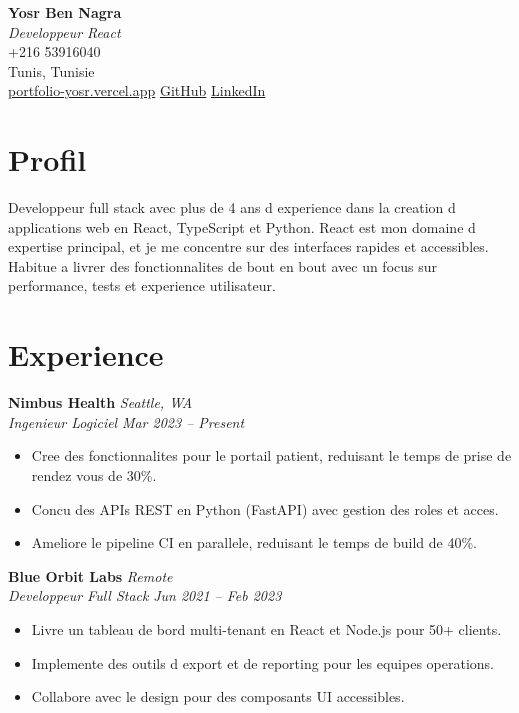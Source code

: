 \documentclass[11pt,a4paper]{article}
\begin{document}
\begin{center}
  {\LARGE\textbf{Yosr Ben Nagra}}\\
  \vspace{2pt}
  \textit{Developpeur React}\\
  \vspace{4pt}
  +216 53916040\\
  Tunis, Tunisie\\
  \href{https://portfolio-yosr.vercel.app/en}{portfolio-yosr.vercel.app} \textbar{} \href{https://github.com/YosrBennagra}{GitHub} \textbar{} \href{https://www.linkedin.com/in/yosr-ben-nagra/}{LinkedIn}
\end{center}

\section*{Profil}
Developpeur full stack avec plus de 4 ans d experience dans la creation d applications web en React, TypeScript et Python. React est mon domaine d expertise principal, et je me concentre sur des interfaces rapides et accessibles. Habitue a livrer des fonctionnalites de bout en bout avec un focus sur performance, tests et experience utilisateur.

\section*{Experience}
\textbf{Nimbus Health} \hfill \textit{Seattle, WA}\\
\textit{Ingenieur Logiciel} \hfill \textit{Mar 2023 -- Present}
\begin{itemize}[leftmargin=12pt,itemsep=2pt]
  \item Cree des fonctionnalites pour le portail patient, reduisant le temps de prise de rendez vous de 30\%.
  \item Concu des APIs REST en Python (FastAPI) avec gestion des roles et acces.
  \item Ameliore le pipeline CI en parallele, reduisant le temps de build de 40\%.
\end{itemize}

\textbf{Blue Orbit Labs} \hfill \textit{Remote}\\
\textit{Developpeur Full Stack} \hfill \textit{Jun 2021 -- Feb 2023}
\begin{itemize}[leftmargin=12pt,itemsep=2pt]
  \item Livre un tableau de bord multi-tenant en React et Node.js pour 50+ clients.
  \item Implemente des outils d export et de reporting pour les equipes operations.
  \item Collabore avec le design pour des composants UI accessibles.
\end{itemize}
\end{document}
